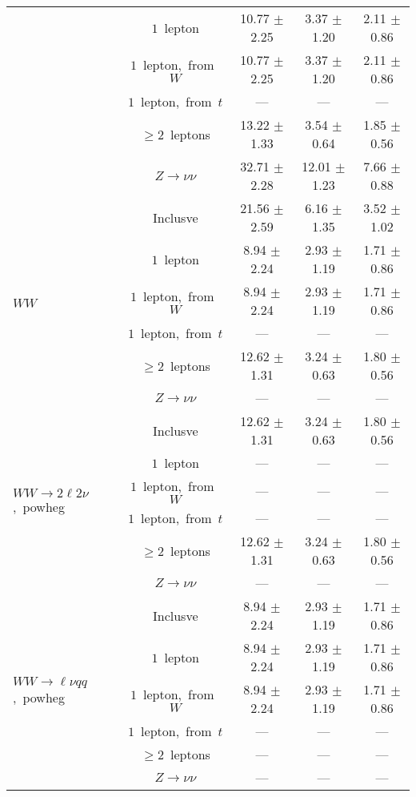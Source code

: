 \documentclass{article}
\begin{document}
\begin{longtable}{|l|c|c|c|c|}
 & $1$~lepton  & 10.77 $\pm$ 2.25  & 3.37 $\pm$ 1.20  & 2.11 $\pm$ 0.86 \\* 
 & $1$~lepton,~from~$W$  & 10.77 $\pm$ 2.25  & 3.37 $\pm$ 1.20  & 2.11 $\pm$ 0.86 \\* 
 & $1$~lepton,~from~$t$  & ---  & ---  & --- \\* 
 & $\ge2$~leptons  & 13.22 $\pm$ 1.33  & 3.54 $\pm$ 0.64  & 1.85 $\pm$ 0.56 \\* 
 & $Z\rightarrow\nu\nu$  & 32.71 $\pm$ 2.28  & 12.01 $\pm$ 1.23  & 7.66 $\pm$ 0.88 \\* 
\hline 
\multirow{6}{*}{$WW$} & Inclusve  & 21.56 $\pm$ 2.59  & 6.16 $\pm$ 1.35  & 3.52 $\pm$ 1.02 \\* 
 & $1$~lepton  & 8.94 $\pm$ 2.24  & 2.93 $\pm$ 1.19  & 1.71 $\pm$ 0.86 \\* 
 & $1$~lepton,~from~$W$  & 8.94 $\pm$ 2.24  & 2.93 $\pm$ 1.19  & 1.71 $\pm$ 0.86 \\* 
 & $1$~lepton,~from~$t$  & ---  & ---  & --- \\* 
 & $\ge2$~leptons  & 12.62 $\pm$ 1.31  & 3.24 $\pm$ 0.63  & 1.80 $\pm$ 0.56 \\* 
 & $Z\rightarrow\nu\nu$  & ---  & ---  & --- \\* 
\hline 
\multirow{6}{*}{$WW{\rightarrow}2\ell2\nu$,~powheg} & Inclusve  & 12.62 $\pm$ 1.31  & 3.24 $\pm$ 0.63  & 1.80 $\pm$ 0.56 \\* 
 & $1$~lepton  & ---  & ---  & --- \\* 
 & $1$~lepton,~from~$W$  & ---  & ---  & --- \\* 
 & $1$~lepton,~from~$t$  & ---  & ---  & --- \\* 
 & $\ge2$~leptons  & 12.62 $\pm$ 1.31  & 3.24 $\pm$ 0.63  & 1.80 $\pm$ 0.56 \\* 
 & $Z\rightarrow\nu\nu$  & ---  & ---  & --- \\* 
\hline 
\multirow{6}{*}{$WW{\rightarrow}{\ell}{\nu}qq$,~powheg} & Inclusve  & 8.94 $\pm$ 2.24  & 2.93 $\pm$ 1.19  & 1.71 $\pm$ 0.86 \\* 
 & $1$~lepton  & 8.94 $\pm$ 2.24  & 2.93 $\pm$ 1.19  & 1.71 $\pm$ 0.86 \\* 
 & $1$~lepton,~from~$W$  & 8.94 $\pm$ 2.24  & 2.93 $\pm$ 1.19  & 1.71 $\pm$ 0.86 \\* 
 & $1$~lepton,~from~$t$  & ---  & ---  & --- \\* 
 & $\ge2$~leptons  & ---  & ---  & --- \\* 
 & $Z\rightarrow\nu\nu$  & ---  & ---  & --- \\* 
\hline 

\end{longtable}
\end{document}
